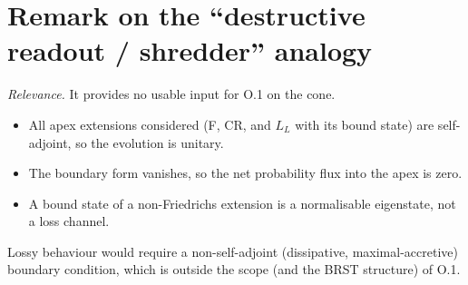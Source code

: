 \documentclass[11pt]{article}
\theoremstyle{definition}
\begin{document}
\appendix
\section{Remark on the ``destructive readout / shredder'' analogy}
\emph{Relevance.} It provides no usable input for O.1 on the cone.
\begin{itemize}
\item All apex extensions considered (F, CR, and $L_L$ with its bound state) are self-adjoint, so the evolution is unitary.
\item The boundary form vanishes, so the net probability flux into the apex is zero.
\item A bound state of a non-Friedrichs extension is a normalisable eigenstate, not a loss channel.
\end{itemize}
Lossy behaviour would require a non-self-adjoint (dissipative, maximal-accretive) boundary condition, which is outside the scope (and the BRST structure) of O.1.
\end{document}
